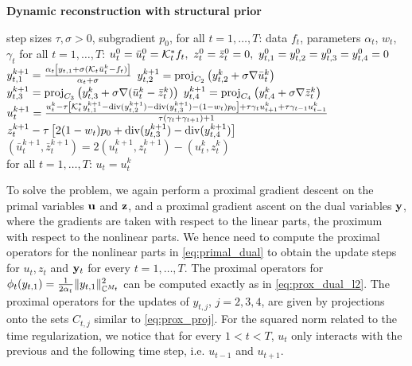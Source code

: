 %
\begin{algorithm}[t!]
\caption{\textbf{Dynamic reconstruction with structural prior}}
{
\begin{algorithmic}[1]
\Require step sizes $\tau,\sigma > 0$, subgradient $p_0$, for all $t=1,\dots,T$: data $f_t$, parameters $\alpha_t$, $w_t$, $\gamma_t$
\Ensure for all $t=1,\dots,T$: $u_t^0 = \bar{u}_t^0 = \mathcal{K}_t^*f_t, ~ z_t^0 = \bar{z}_t^0 = 0, ~ y_{t,1}^0 = y_{t,2}^0 = y_{t,3}^0 = y_{t,4}^0 = 0$
          \State $y_{t,1}^{k+1} = \frac{\alpha_t \left[ y_{t,1} + \sigma (\mathcal{K}_t \bar{u}_t^k - f_t)\right]}{\alpha_t + \sigma}$
          \State $y_{t,2}^{k+1} = \mathrm{proj}_{C_2}\left(y_{t,2}^k + \sigma \nabla \bar{u}_t^k\right)$
          \State $y_{t,3}^{k+1} = \mathrm{proj}_{C_3}\left(y_{t,3}^k + \sigma \nabla (\bar{u}_t^k - \bar{z}_t^k) \right)$
          \State $y_{t,4}^{k+1} = \mathrm{proj}_{C_4}\left(y_{t,4}^k + \sigma \nabla \bar{z}_t^k \right)$
          \State $u_t^{k+1} =  \frac{u_t^k - \tau \left[ \mathcal{K}_t^* y_{t,1}^{k+1} - \mathrm{div}(y_{t,2}^{k+1}) - \mathrm{div}(y_{t,3}^{k+1}) - (1-w_t)p_0 \right] + \tau \gamma_t u_{t+1}^k + \tau \gamma_{t-1} u_{t-1}^k}{\tau (\gamma_t + \gamma_{t+1}) +1}$
          \State $z_t^{k+1} - \tau \left[ 2(1-w_t) p_0 + \mathrm{div}(y_{t,3}^{k+1}) - \mathrm{div}(y_{t,4}^{k+1}) \right]$
          \State $(\bar{u}_t^{k+1}, \bar{z}_t^{k+1}) = 2 (u_t^{k+1}, z_t^{k+1}) - (u_t^k,z_t^k)$
    	\EndFor
	\EndWhile\\
\Return for all $t = 1,\dots,T$: $u_t = u_t^k$
\end{algorithmic}
}
\label{alg:fmri}
\end{algorithm}
%
To solve the problem, we again perform a proximal gradient descent on the primal variables $\mathbf{u}$ and $\mathbf{z}$, and a proximal gradient ascent on the dual variables $\mathbf{y}$, where the gradients are taken with respect to the linear parts, the proximum with respect to the nonlinear parts. 
We hence need to compute the proximal operators for the nonlinear parts in \eqref{eq:primal_dual} to obtain the update steps for $u_t,z_t$ and $\mathbf{y}_t$ for every $t = 1, \dots, T$. 
The proximal operators for $\phi_t(y_{t,1}) = \frac{1}{2 \alpha_t} \| y_{t,1} \|_{\mathbb{C}^{M_t}}^2$ can be computed exactly as in \eqref{eq:prox_dual_l2}.
The proximal operators for the updates of $y_{t,j}$, $j = 2,3,4$, are given by projections onto the sets $C_{t,j}$ similar to \eqref{eq:prox_proj}.
For the squared norm related to the time regularization, we notice that for every $1< t < T$, $u_t$ only interacts with the previous and the following time step, i.e. $u_{t-1}$ and  $u_{t+1}$. 
